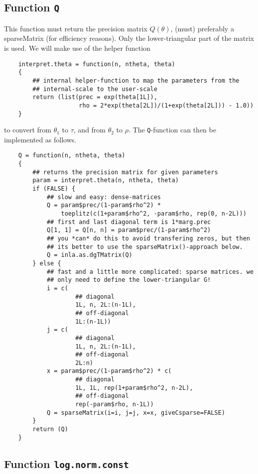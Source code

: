 \documentclass[a4paper,11pt]{article}
\begin{document}
\subsection*{Function \texttt{Q}}

This function must return the precision matrix $Q(\theta)$, (must)
preferably a sparseMatrix (for efficiency reasons). Only the
lower-triangular part of the matrix is used. We will make use of the
helper function
\begin{verbatim}
    interpret.theta = function(n, ntheta, theta)
    {
        ## internal helper-function to map the parameters from the
        ## internal-scale to the user-scale
        return (list(prec = exp(theta[1L]),
                     rho = 2*exp(theta[2L])/(1+exp(theta[2L])) - 1.0))
    }
\end{verbatim}
to convert from $\theta_{1}$ to $\tau$, and from $\theta_{2}$ to
$\rho$.  The \texttt{Q}-function can then be implemented as follows.
\begin{verbatim}
    Q = function(n, ntheta, theta)
    {
        ## returns the precision matrix for given parameters
        param = interpret.theta(n, ntheta, theta)
        if (FALSE) {
            ## slow and easy: dense-matrices
            Q = param$prec/(1-param$rho^2) *
                toeplitz(c(1+param$rho^2, -param$rho, rep(0, n-2L)))
            ## first and last diagonal term is 1*marg.prec
            Q[1, 1] = Q[n, n] = param$prec/(1-param$rho^2)
            ## you *can* do this to avoid transfering zeros, but then
            ## its better to use the sparseMatrix()-approach below.
            Q = inla.as.dgTMatrix(Q)
        } else {
            ## fast and a little more complicated: sparse matrices. we
            ## only need to define the lower-triangular G!
            i = c(
                    ## diagonal
                    1L, n, 2L:(n-1L),
                    ## off-diagonal
                    1L:(n-1L))
            j = c(
                    ## diagonal
                    1L, n, 2L:(n-1L),
                    ## off-diagonal
                    2L:n)
            x = param$prec/(1-param$rho^2) * c(
                    ## diagonal
                    1L, 1L, rep(1+param$rho^2, n-2L),
                    ## off-diagonal
                    rep(-param$rho, n-1L))
            Q = sparseMatrix(i=i, j=j, x=x, giveCsparse=FALSE)
        }            
        return (Q)
    }
\end{verbatim}

\subsection*{Function \texttt{log.norm.const}}
\end{document}
